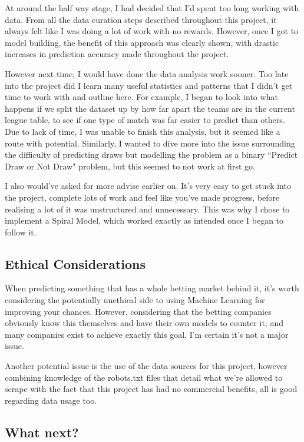 \documentclass[12pt,a4paper,twoside,openright]{report}
\begin{document}
At around the half way stage, I had decided that I'd spent too long working with data. From all the data curation steps described throughout this project, it always felt like I was doing a lot of work with no rewards. However, once I got to model building, the benefit of this approach was clearly shown, with drastic increases in prediction accuracy made throughout the project.

However next time, I would have done the data analysis work sooner. Too late into the project did I learn many useful statistics and patterns that I didn't get time to work with and outline here. For example, I began to look into what happens if we split the dataset up by how far apart the teams are in the current league table, to see if one type of match was far easier to predict than others. Due to lack of time, I was unable to finish this analysis, but it seemed like a route with potential. Similarly, I wanted to dive more into the issue surrounding the difficulty of predicting draws but modelling the problem as a binary ``Predict Draw or Not Draw" problem, but this seemed to not work at first go.

I also would've asked for more advise earlier on. It's very easy to get stuck into the project, complete lots of work and feel like you've made progress, before realising a lot of it was unstructured and unnecessary. This was why I chose to implement a Spiral Model, which worked exactly as intended once I began to follow it.

\subsection{Ethical Considerations}

When predicting something that has a whole betting market behind it, it's worth considering the potentially unethical side to using Machine Learning for improving your chances. However, considering that the betting companies obviously know this themselves and have their own models to counter it, and many companies exist to achieve exactly this goal, I'm certain it's not a major issue.

Another potential issue is the use of the data sources for this project, however combining knowledge of the robots.txt files that detail what we're allowed to scrape with the fact that this project has had no commercial benefits, all is good regarding data usage too.

\subsection{What next?}
\end{document}

